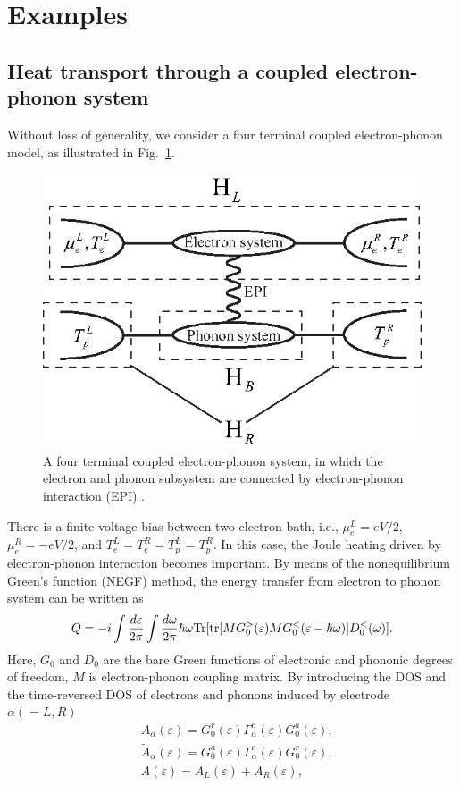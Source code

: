 \documentclass[aps
,twocolumn
,floatfix,footinbib,prl,longbibliography
]{revtex4-1}
\begin{document}
\section{Examples}
\subsection{Heat transport through a coupled electron-phonon system}
Without loss of generality, we consider a four terminal coupled electron-phonon model, as illustrated
in Fig.~\ref{heat}.
%
\begin{figure}
\centering
\includegraphics[width=8 cm]{heat.eps}
\caption{A four terminal coupled electron-phonon system, in which the electron and phonon subsystem are connected by electron-phonon interaction (EPI) .}
\label{heat}
\end{figure}
%
There is a finite voltage bias between two electron bath, i.e., $\mu_{e}^{L}=eV/2$, $\mu_{e}^{R}=-eV/2$, and $T_{e}^{L}=T_{e}^{R}=T_{p}^{L}=T_{p}^{R}$. In this case, the Joule heating driven by electron-phonon interaction becomes important. By means of the nonequilibrium Green’s function (NEGF) method, the energy transfer from electron to phonon system can be written as\cite{lu2007coupled}
\begin{equation}
\begin{split}
Q=-i\int\frac{d \varepsilon}{2 \pi}\int\frac{d \omega}{2 \pi}\hbar\omega{\rm Tr}[{\rm tr}[MG_{0}^{>}(\varepsilon)M
G_{0}^{<}(\varepsilon-\hbar\omega)]D_{0}^{<}(\omega)].
\end{split}
\end{equation}
Here, $G_{0}$ and $D_{0}$ are the bare Green functions of electronic and phononic degrees of freedom, $M$ is electron-phonon coupling matrix. 
By introducing the DOS and the time-reversed DOS of electrons and phonons induced by electrode $\alpha(=L,R)$\cite{lu2016electron}
\begin{equation}
\begin{split}
&A_{\alpha}(\varepsilon)=G_{0}^{r}(\varepsilon)\Gamma_{\alpha}^{e}(\varepsilon)G_{0}^{a}(\varepsilon),\\
&\tilde{A}_{\alpha}(\varepsilon)=G_{0}^{a}(\varepsilon)\Gamma_{\alpha}^{e}(\varepsilon)G_{0}^{r}(\varepsilon),\\
&A(\varepsilon)=A_{L}(\varepsilon)+A_{R}(\varepsilon),
\end{split}
\end{equation}
\end{document}
